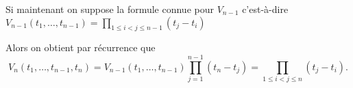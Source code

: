 {{Si maintenant on suppose la formule connue pour $V_{n-1}$
c'est-à-dire $V_{n-1}(t_1,\ldots,t_{n-1})
= \prod_{1 \le i < j \le n-1} (t_j - t_i)$

Alors on obtient par récurrence que
$$V_n(t_1,\ldots,t_{n-1},t_n)= V_{n-1}(t_1,\ldots,t_{n-1})\prod_{j=1}^{n-1}(t_n-t_j) =  \prod_{1 \le i < j \le n} (t_j - t_i).$$}
}